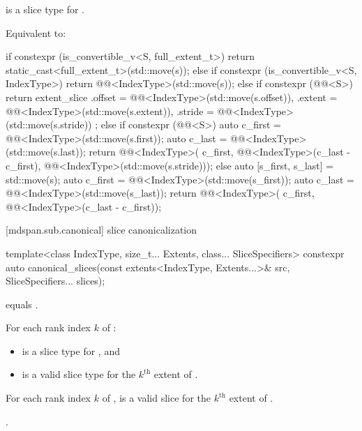 \begin{itemdescr}
\pnum
\mandates
{} is a  slice type for .

\pnum
\effects
Equivalent to:
\begin{codeblock}
if constexpr (is_convertible_v<S, full_extent_t>) {
  return static_cast<full_extent_t>(std::move(s));
} else if constexpr (is_convertible_v<S, IndexType>) {
  return @@<IndexType>(std::move(s));
} else if constexpr (@@<S>) {
  return extent_slice{
    .offset = @@<IndexType>(std::move(s.offset)),
    .extent = @@<IndexType>(std::move(s.extent)),
    .stride = @@<IndexType>(std::move(s.stride))
  };
} else if constexpr (@@<S>) {
  auto c_first = @@<IndexType>(std::move(s.first));
  auto c_last  = @@<IndexType>(std::move(s.last));
  return @@<IndexType>(
    c_first,
    @@<IndexType>(c_last - c_first),
    @@<IndexType>(std::move(s.stride)));
} else {
  auto [s_first, s_last] = std::move(s);
  auto c_first = @@<IndexType>(std::move(s_first));
  auto c_last  = @@<IndexType>(std::move(s_last));
  return @@<IndexType>(
    c_first,
    @@<IndexType>(c_last - c_first));
}
\end{codeblock}
\end{itemdescr}

[mdspan.sub.canonical]{ slice canonicalization}

%
\begin{itemdecl}
template<class IndexType, size_t... Extents, class... SliceSpecifiers>
  constexpr auto canonical_slices(const extents<IndexType, Extents...>& src,
                                  SliceSpecifiers... slices);
\end{itemdecl}

\begin{itemdescr}
\pnum
\constraints
{} equals .

\pnum
\mandates
For each rank index $k$ of :
\begin{itemize}
\item
  is a  slice type for , and
\item
  is a valid  slice type for the $k^\text{th}$ extent of
  .
\end{itemize}

\pnum
\expects
For each rank index $k$ of ,
is a valid  slice for the $k^\text{th}$ extent of .

\pnum
\returns
{}.
\end{itemdescr}

